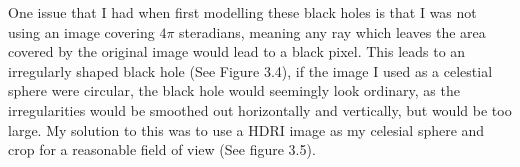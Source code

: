 \documentclass[oneside,openright,frontopenright]{dmathesis}
\begin{document}
	One issue that I had when first modelling these black holes is that I was not using an image covering $4\pi$ steradians, meaning any ray which leaves the area covered by the original image would lead to a black pixel. This leads to an irregularly shaped black hole (See Figure 3.4), if the image I used as a celestial sphere were circular, the black hole would seemingly look ordinary, as the irregularities would be smoothed out horizontally and vertically, but would be too large. My solution to this was to use a HDRI image as my celesial sphere and crop for a reasonable field of view (See figure 3.5).

\appendix
%
%


{}
\end{document}
